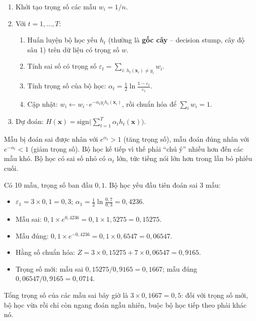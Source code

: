\begin{definition}
\begin{enumerate}
    \item Khởi tạo trọng số các mẫu $w_i = 1/n$.
    \item Với $t = 1, \dots, T$:
    \begin{enumerate}
        \item Huấn luyện bộ học yếu $h_t$ (thường là \textbf{gốc cây} -- decision stump, cây độ sâu 1) trên dữ liệu có trọng số $w$.
        \item Tính sai số có trọng số $\varepsilon_t = \sum_{i:\, h_t(\mathbf{x}_i) \neq y_i} w_i$.
        \item Tính trọng số của bộ học: $\alpha_t = \frac{1}{2}\ln\frac{1 - \varepsilon_t}{\varepsilon_t}$.
        \item Cập nhật: $w_i \leftarrow w_i \cdot e^{-\alpha_t y_i h_t(\mathbf{x}_i)}$, rồi chuẩn hóa để $\sum_i w_i = 1$.
    \end{enumerate}
    \item Dự đoán: $H(\mathbf{x}) = \mathrm{sign}\Big(\sum_{t=1}^{T} \alpha_t h_t(\mathbf{x})\Big)$.
\end{enumerate}
\end{definition}

Mẫu bị đoán sai được nhân với $e^{\alpha_t} > 1$ (tăng trọng số), mẫu đoán đúng nhân với $e^{-\alpha_t} < 1$ (giảm trọng số). Bộ học kế tiếp vì thế phải ``chú ý'' nhiều hơn đến các mẫu khó. Bộ học có sai số nhỏ có $\alpha_t$ lớn, tức tiếng nói lớn hơn trong lần bỏ phiếu cuối.

\begin{example}
Có 10 mẫu, trọng số ban đầu $0{,}1$. Bộ học yếu đầu tiên đoán sai 3 mẫu:
\begin{itemize}
    \item $\varepsilon_1 = 3 \times 0{,}1 = 0{,}3$; \quad $\alpha_1 = \frac{1}{2}\ln\frac{0{,}7}{0{,}3} = 0{,}4236$.
    \item Mẫu sai: $0{,}1 \times e^{0{,}4236} = 0{,}1 \times 1{,}5275 = 0{,}15275$.
    \item Mẫu đúng: $0{,}1 \times e^{-0{,}4236} = 0{,}1 \times 0{,}6547 = 0{,}06547$.
    \item Hằng số chuẩn hóa: $Z = 3 \times 0{,}15275 + 7 \times 0{,}06547 = 0{,}9165$.
    \item Trọng số mới: mẫu sai $0{,}15275/0{,}9165 = 0{,}1667$; mẫu đúng $0{,}06547/0{,}9165 = 0{,}0714$.
\end{itemize}
Tổng trọng số của các mẫu sai bây giờ là $3 \times 0{,}1667 = 0{,}5$: đối với trọng số mới, bộ học vừa rồi chỉ còn ngang đoán ngẫu nhiên, buộc bộ học tiếp theo phải khác nó.
\end{example}

